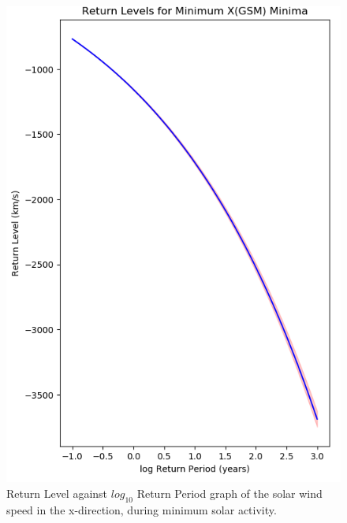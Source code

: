 \documentclass[12pt]{article}
\begin{document}
\begin{figure}[t!]
\begin{minipage}{0.48\textwidth}
                \includegraphics[width=\textwidth]{fig_method/SWEminXminReturn.png}
                \caption{Return Level against $log_{10}$ Return Period graph of the solar wind speed in the x-direction, during minimum solar activity.}
                \label{fig:SWEminXminReturn}
            \end{minipage}
        \end{figure}
\end{document}
